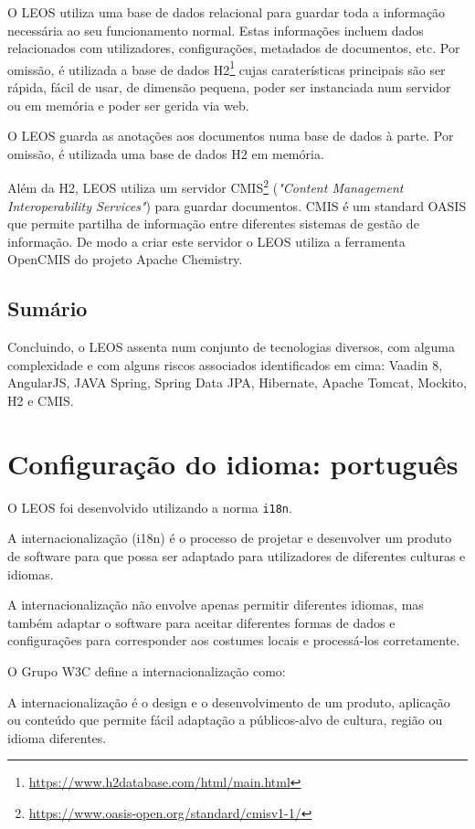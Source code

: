 O LEOS utiliza uma base de dados relacional para guardar toda a informação necessária ao seu funcionamento normal. 
Estas informações incluem dados relacionados com utilizadores, configurações, metadados de documentos, etc. 
Por omissão, é utilizada a base de dados H2\footnote{\url{https://www.h2database.com/html/main.html}} cujas caraterísticas 
principais são ser rápida, fácil de usar, de dimensão pequena, poder ser instanciada num servidor ou em memória e 
poder ser gerida via web.

O LEOS guarda as anotações aos documentos numa base de dados à parte. 
Por omissão, é utilizada uma base de dados H2 em memória.

Além da H2, LEOS utiliza um servidor CMIS\footnote{\url{https://www.oasis-open.org/standard/cmisv1-1/}} 
(\emph{"Content Management Interoperability Services"}) para guardar documentos. 
CMIS é um standard OASIS que permite partilha de informação entre diferentes sistemas de gestão de informação. 
De modo a criar este servidor o LEOS utiliza a  ferramenta OpenCMIS do projeto Apache Chemistry.

\subsection{Sumário}

Concluindo, o LEOS assenta num conjunto de tecnologias diversos, com alguma complexidade e com alguns 
riscos associados identificados em cima: Vaadin 8, AngularJS, JAVA Spring, Spring Data JPA, Hibernate, Apache Tomcat,
Mockito, H2 e CMIS.

\section{Configuração do idioma: português}

O LEOS foi desenvolvido utilizando a norma \texttt{i18n}.

A internacionalização (i18n) é o processo de projetar e desenvolver um produto de software para que possa ser adaptado para 
utilizadores de diferentes culturas e idiomas.

A internacionalização não envolve apenas permitir diferentes idiomas, mas também adaptar o software para aceitar diferentes 
formas de dados e configurações para corresponder aos costumes locais e processá-los corretamente.

O Grupo W3C define a internacionalização como:
\begin{quoting}
A internacionalização é o design e o desenvolvimento de um produto, aplicação ou conteúdo que permite fácil 
adaptação a públicos-alvo de cultura, região ou idioma diferentes.
\end{quoting}

